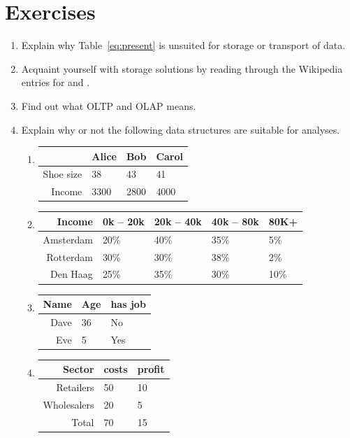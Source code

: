 \newpage{}
\section{Exercises}
\label{sect:exfaces}
\begin{enumerate}
  \item Explain why Table~\eqref{eq:present} is unsuited for storage or transport of data.
  \item Acquaint yourself with storage solutions by reading through the Wikipedia
  entries for  and
  .
  \item Find out what OLTP and OLAP means.
  \item Explain why or not the following data structures are suitable for analyses.
  \begin{enumerate}
      \item 
          \begin{tabular}{|r|lll|}
          \hline
                    & Alice & Bob & Carol \\
          \hline
          Shoe size & 38    & 43  & 41    \\
          Income    & 3300  & 2800& 4000  \\
          \hline
          \end{tabular}
      \item 
          \begin{tabular}{|r|llll|}
          \hline
            Income   &   0k -- 20k   &  20k -- 40k  &  40k -- 80k   & 80K+ \\
          \hline 
           Amsterdam & 20\%          &   40\%       &   35\%        & 5\%  \\
           Rotterdam & 30\%          &   30\%       &   38\%        & 2\%  \\
           Den Haag  & 25\%          &   35\%       &   30\%        &10\%  \\
          \hline
          \end{tabular}

      \item
          \begin{tabular}{|r|ll|}
          \hline
           Name & Age  &has job \\
          \hline
           Dave & 36   &No      \\
           Eve  & 5    &Yes     \\
          \hline
          \end{tabular}
      \item
\begin{tabular}{|r|ll|}
\hline
 Sector      & costs  &profit \\
\hline
 Retailers   & 50     &10     \\
 Wholesalers & 20     & 5     \\
 Total       & 70     &15     \\
\hline
\end{tabular}



\end{enumerate}
\end{enumerate}
